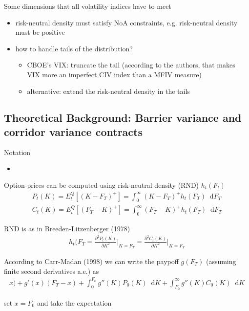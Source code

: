 \documentclass{article}
\newcommand*\diff{\mathop{}\!\mathrm{d}}
\begin{document}
Some dimensions that all volatility indices have to meet
\begin{itemize}
    \item risk-neutral density must satisfy NoA constraints, e.g. risk-neutral density must be positive
    \item how to handle tails of the distribution?
    \begin{itemize}
        \item CBOE's VIX: truncate the tail (according to the authors, that makes VIX more an imperfect CIV index than a MFIV measure)
        \item alternative: extend the risk-neutral density in the tails
    \end{itemize}
\end{itemize}

\subsection{Theoretical Background: Barrier variance and corridor variance contracts}

Notation
\begin{itemize}
    \item 
\end{itemize}

Option-prices can be computed using risk-neutral density (RND) $h_{t}(F_{t})$
\begin{align*}
P_{t}(K) = E_{t}^{Q}[(K - F_{T})^{+}] = \int_{0}^{\infty} (K-F_{T})^{+} h_{t}(F_{T}) \diff F_{T} \\
C_{t}(K) = E_{t}^{Q}[(F_{T} - K)^{+}] = \int_{0}^{\infty} (F_{T} - K)^{+} h_{t}(F_{T}) \diff F_{T}
\end{align*}

RND is as in Breeden-Litzenberger (1978)
\begin{align*}
    h_{t}(F_{T} = \frac{\partial^{2} P_{t}(K)}{\partial K^{2}} \big\rvert_{K = F_{T}} = \frac{\partial^{2} C_{t}(K)}{\partial K^{2}} \big\rvert_{K = F_{T}} 
\end{align*}

According to Carr-Madan (1998) we can write the paypoff $g(F_{T})$ (assuming finite second derivatives a.e.) as
\begin{align*}x) + g'(x)(F_{T} - x) + \int_{0}^{F_{0}} g''(K)P_{0}(K) \diff K + \int_{F_{0}}^{\infty} g''(K)C_{0}(K) \diff K
\end{align*}

set $x = F_{0}$ and take the expectation
\end{document}
